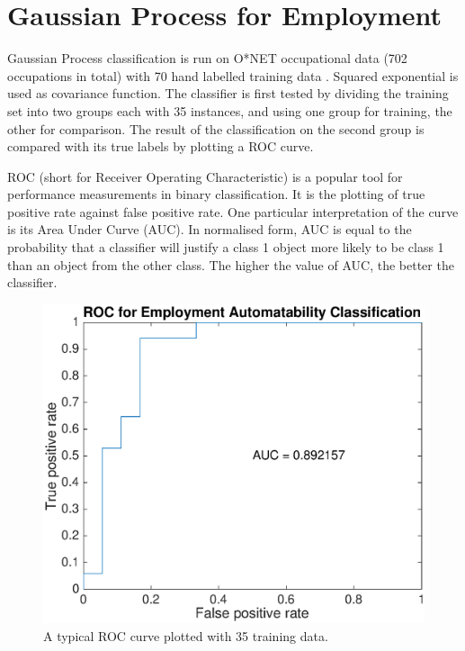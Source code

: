 \documentclass[14pt]{report}
\numberwithin{equation}{chapter}
\begin{document}
\begin{spacing}{2}
\begin{figure}
\end{figure}

\chapter{Gaussian Process for Employment}
Gaussian Process classification is run on O*NET occupational data (702 occupations in total) with 70 hand labelled training data \cite{frey2013future}. 
Squared exponential is used as covariance function. The classifier is first tested by dividing the training set into two groups each with 35 instances, and using one group for training, the other for comparison. The result of the classification on the second group is compared with its true labels by plotting a ROC curve. 

ROC (short for Receiver Operating Characteristic) is a popular tool for performance measurements in binary classification. It is the plotting of true positive rate against false positive rate. One particular interpretation of the curve is its Area Under Curve (AUC). In normalised form, AUC is equal to the probability that a classifier will justify a class 1 object more likely to be class 1 than an object from the other class. The higher the value of AUC, the better the classifier.

\begin{figure}
\centering
\includegraphics[scale=0.5]{ROC1.eps}
\caption{A typical ROC curve plotted with 35 training data. }
\end{figure}



\newpage





\end{spacing}
\end{document}
